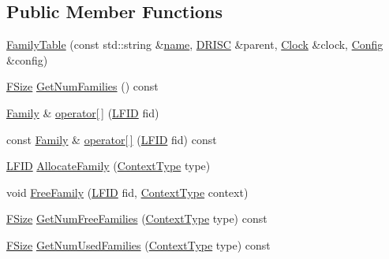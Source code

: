 \subsection*{Public Member Functions}
\begin{DoxyCompactItemize}
\item 
\hyperlink{class_simulator_1_1drisc_1_1_family_table_a9029aa5cf735e64452314e50193d37ee}{Family\+Table} (const std\+::string \&\hyperlink{mtconf_8c_a8f8f80d37794cde9472343e4487ba3eb}{name}, \hyperlink{class_simulator_1_1_d_r_i_s_c}{D\+R\+I\+S\+C} \&parent, \hyperlink{class_simulator_1_1_clock}{Clock} \&clock, \hyperlink{class_config}{Config} \&config)
\item 
\hyperlink{namespace_simulator_a06544009313d7c13d411b1c074e5acff}{F\+Size} \hyperlink{class_simulator_1_1drisc_1_1_family_table_a77f3dfaf607e6409fbd336f11e72642a}{Get\+Num\+Families} () const 
\item 
\hyperlink{struct_simulator_1_1drisc_1_1_family}{Family} \& \hyperlink{class_simulator_1_1drisc_1_1_family_table_ae72d1b32cd0ceaa4d5a8a82829d4998d}{operator\mbox{[}$\,$\mbox{]}} (\hyperlink{namespace_simulator_aaccbc706b2d6c99085f52f6dfc2333e4}{L\+F\+I\+D} fid)
\item 
const \hyperlink{struct_simulator_1_1drisc_1_1_family}{Family} \& \hyperlink{class_simulator_1_1drisc_1_1_family_table_a3623787209fd99307ac0670f255b0f67}{operator\mbox{[}$\,$\mbox{]}} (\hyperlink{namespace_simulator_aaccbc706b2d6c99085f52f6dfc2333e4}{L\+F\+I\+D} fid) const 
\item 
\hyperlink{namespace_simulator_aaccbc706b2d6c99085f52f6dfc2333e4}{L\+F\+I\+D} \hyperlink{class_simulator_1_1drisc_1_1_family_table_a79281183526d6db39fab77082005e85e}{Allocate\+Family} (\hyperlink{namespace_simulator_ab3233bd11b43e37322a8111dc7eec133}{Context\+Type} type)
\item 
void \hyperlink{class_simulator_1_1drisc_1_1_family_table_a74de0961e3e56b837507393a14e306ac}{Free\+Family} (\hyperlink{namespace_simulator_aaccbc706b2d6c99085f52f6dfc2333e4}{L\+F\+I\+D} fid, \hyperlink{namespace_simulator_ab3233bd11b43e37322a8111dc7eec133}{Context\+Type} context)
\item 
\hyperlink{namespace_simulator_a06544009313d7c13d411b1c074e5acff}{F\+Size} \hyperlink{class_simulator_1_1drisc_1_1_family_table_a2719dc5cde15360afd11d0850bb1513d}{Get\+Num\+Free\+Families} (\hyperlink{namespace_simulator_ab3233bd11b43e37322a8111dc7eec133}{Context\+Type} type) const 
\item 
\hyperlink{namespace_simulator_a06544009313d7c13d411b1c074e5acff}{F\+Size} \hyperlink{class_simulator_1_1drisc_1_1_family_table_abc24fed55692d4fce7415132c929727a}{Get\+Num\+Used\+Families} (\hyperlink{namespace_simulator_ab3233bd11b43e37322a8111dc7eec133}{Context\+Type} type) const 

\end{DoxyCompactItemize}
